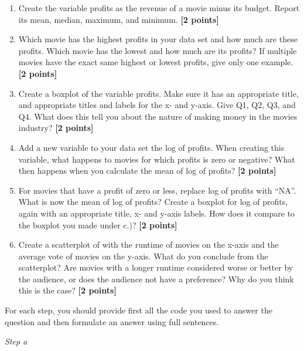 \documentclass[
]{article}
\newenvironment{Shaded}{\begin{snugshade}}{\end{snugshade}}
\newcommand{\FunctionTok}[1]{\textcolor[rgb]{0.13,0.29,0.53}{\textbf{#1}}}
\newcommand{\NormalTok}[1]{#1}
\newcommand{\OtherTok}[1]{\textcolor[rgb]{0.56,0.35,0.01}{#1}}
\newcommand{\SpecialCharTok}[1]{\textcolor[rgb]{0.81,0.36,0.00}{\textbf{#1}}}
\providecommand{\tightlist}{%
  \setlength{\itemsep}{0pt}\setlength{\parskip}{0pt}}
\begin{document}
\begin{enumerate}
\def\labelenumi{\alph{enumi}.}
\tightlist
\item
  Create the variable profits as the revenue of a movie minus its
  budget. Report its mean, median, maximum, and minimum.
  \textbf{[2 points]}
\item
  Which movie has the highest profits in your data set and how much are
  these profits. Which movie has the lowest and how much are its
  profits? If multiple movies have the exact same highest or lowest
  profits, give only one example. \textbf{[2 points]}
\item
  Create a boxplot of the variable profits. Make sure it has an
  appropriate title, and appropriate titles and labels for the x- and
  y-axis. Give Q1, Q2, Q3, and Q4. What does this tell you about the
  nature of making money in the movies industry? \textbf{[2 points]}
\item
  Add a new variable to your data set the log of profits. When creating
  this variable, what happens to movies for which profits is zero or
  negative? What then happens when you calculate the mean of log of
  profits? \textbf{[2 points]}
\item
  For movies that have a profit of zero or less, replace log of profits
  with ``NA''. What is now the mean of log of profits? Create a boxplot
  for log of profits, again with an appropriate title, x- and y-axis
  labels. How does it compare to the boxplot you made under c.)?
  \textbf{[2 points]}
\item
  Create a scatterplot of with the runtime of movies on the x-axis and
  the average vote of movies on the y-axis. What do you conclude from
  the scatterplot? Are movies with a longer runtime considered worse or
  better by the audience, or does the audience not have a preference?
  Why do you think this is the case? \textbf{[2 points]}
\end{enumerate}

For each step, you should provide first all the code you used to answer
the question and then formulate an answer using full sentences.

\emph{Step a}

\begin{Shaded}
\end{Shaded}
\end{document}
